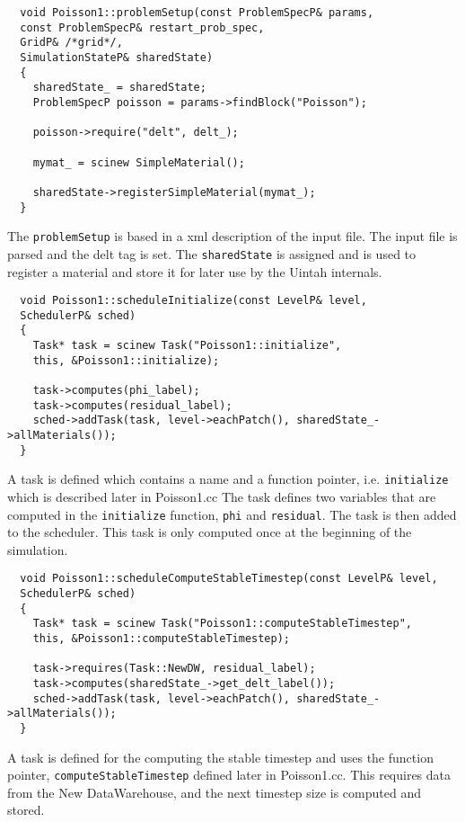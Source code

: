 \documentclass[11pt,fleqn]{book} %
\begin{document}
\begin{lstlisting}
  void Poisson1::problemSetup(const ProblemSpecP& params,
  const ProblemSpecP& restart_prob_spec,
  GridP& /*grid*/,
  SimulationStateP& sharedState)
  {
    sharedState_ = sharedState;
    ProblemSpecP poisson = params->findBlock("Poisson");

    poisson->require("delt", delt_);

    mymat_ = scinew SimpleMaterial();

    sharedState->registerSimpleMaterial(mymat_);
  }
\end{lstlisting}

The \texttt{problemSetup} is based in a xml description of the input
file.  The input file is parsed and the delt tag is set.  The
\texttt{sharedState} is assigned and is used to register a material
and store it for later use by the Uintah internals.

\begin{lstlisting}
  void Poisson1::scheduleInitialize(const LevelP& level,
  SchedulerP& sched)
  {
    Task* task = scinew Task("Poisson1::initialize",
    this, &Poisson1::initialize);

    task->computes(phi_label);
    task->computes(residual_label);
    sched->addTask(task, level->eachPatch(), sharedState_->allMaterials());
  }
\end{lstlisting}

A task is defined which contains a name and a function pointer,
i.e. \texttt{initialize} which is described later in Poisson1.cc The
task defines two variables that are computed in the
\texttt{initialize} function, \texttt{phi} and \texttt{residual}.  The
task is then added to the scheduler.  This task is only computed once
at the beginning of the simulation.

\begin{lstlisting}
  void Poisson1::scheduleComputeStableTimestep(const LevelP& level,
  SchedulerP& sched)
  {
    Task* task = scinew Task("Poisson1::computeStableTimestep",
    this, &Poisson1::computeStableTimestep);

    task->requires(Task::NewDW, residual_label);
    task->computes(sharedState_->get_delt_label());
    sched->addTask(task, level->eachPatch(), sharedState_->allMaterials());
  }

\end{lstlisting}

A task is defined for the computing the stable timestep and uses the
function pointer, \texttt{computeStableTimestep} defined later in
Poisson1.cc.  This requires data from the New DataWarehouse, and the
next timestep size is computed and stored.
\end{document}
